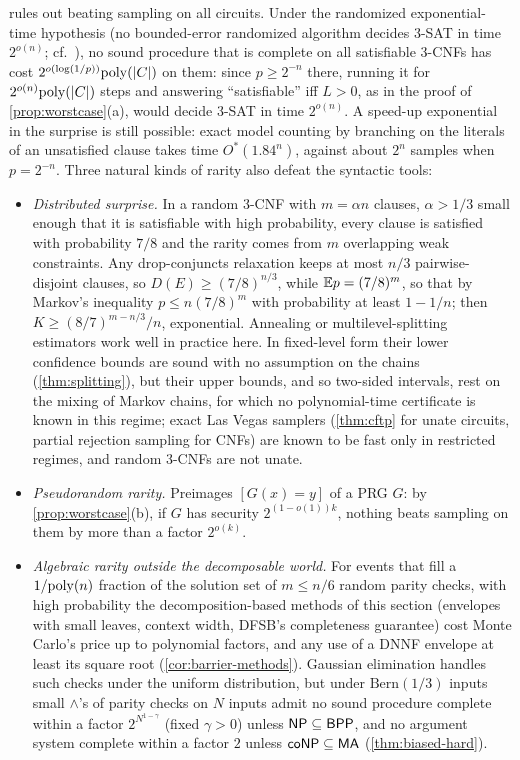  rules out beating sampling on all circuits. Under the
randomized exponential-time hypothesis (no bounded-error randomized algorithm
decides 3-SAT in time $2^{o(n)}$; cf.\ \cite{ip2001eth}), no sound procedure that
is complete on all satisfiable 3-CNFs has cost $2^{o(\log(1/p))}\mathrm{poly}(|C|)$ on them:
since $p\ge2^{-n}$ there, running it for $2^{o(n)}\mathrm{poly}(|C|)$ steps and answering
``satisfiable'' iff $L>0$, as in the proof of \cref{prop:worstcase}(a), would decide
3-SAT in time $2^{o(n)}$. A speed-up exponential in the surprise is still possible:
exact model counting by branching on the literals of an unsatisfied clause takes
time $O^*(1.84^n)$, against about $2^n$ samples when $p=2^{-n}$. Three natural kinds of
rarity also defeat the syntactic tools:
\begin{itemize}
\item \emph{Distributed surprise.} In a random 3-CNF with $m=\alpha n$ clauses,
$\alpha>1/3$ small enough that it is satisfiable with high probability, every
clause is satisfied with probability $7/8$ and the rarity comes from $m$
overlapping weak constraints. Any drop-conjuncts relaxation keeps at most $n/3$
pairwise-disjoint clauses, so $D(E)\ge(7/8)^{n/3}$, while $\mathbb{E} p=(7/8)^m$, so that by
Markov's inequality $p\le n(7/8)^m$ with probability at least $1-1/n$; then
$K\ge(8/7)^{m-n/3}/n$, exponential. Annealing or multilevel-splitting estimators
work well in practice here. In fixed-level form their lower confidence bounds are
sound with no assumption on the chains (\cref{thm:splitting}), but their upper
bounds, and so two-sided intervals, rest on the mixing of Markov
chains, for which no polynomial-time certificate is known in this regime; exact
Las Vegas samplers (\cref{thm:cftp} for unate circuits, partial rejection
sampling \cite{gjl2019} for CNFs) are known to be fast only in restricted regimes,
and random 3-CNFs are not unate.
\item \emph{Pseudorandom rarity.} Preimages $[G(x)=y]$ of a PRG $G$: by
\cref{prop:worstcase}(b), if $G$ has security $2^{(1-o(1))k}$, nothing beats
sampling on them by more than a factor $2^{o(k)}$.
\item \emph{Algebraic rarity outside the decomposable world.} For events that fill a
$1/\mathrm{poly}(n)$ fraction of the solution set of $m\le n/6$ random parity checks, with high
probability the decomposition-based methods of
this section (envelopes with small leaves, context width, DFSB's completeness
guarantee) cost Monte Carlo's price up to polynomial factors, and any use of a DNNF
envelope at least its square root (\cref{cor:barrier-methods}). Gaussian elimination
handles such checks under the uniform distribution, but under $\mathrm{Bern}(1/3)$
inputs small $\wedge$'s of parity checks on $N$ inputs admit no sound procedure complete
within a factor $2^{N^{1-\gamma}}$ (fixed $\gamma>0$) unless $\mathsf{NP}\subseteq\mathsf{BPP}$, and no
argument system complete
within a factor $2$ unless $\mathsf{coNP}\subseteq\mathsf{MA}$ (\cref{thm:biased-hard}).
\end{itemize}

